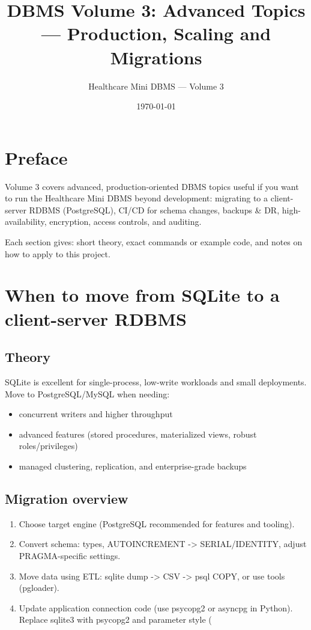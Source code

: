 \documentclass[11pt,a4paper]{article}
\title{DBMS Volume 3: Advanced Topics — Production, Scaling and Migrations}
\author{Healthcare Mini DBMS — Volume 3}
\date{\today}
\begin{document}
\maketitle
\tableofcontents
\newpage

\section*{Preface}
Volume 3 covers advanced, production-oriented DBMS topics useful if you want to run the Healthcare Mini DBMS beyond development: migrating to a client-server RDBMS (PostgreSQL), CI/CD for schema changes, backups & DR, high-availability, encryption, access controls, and auditing.

Each section gives: short theory, exact commands or example code, and notes on how to apply to this project.

\section{When to move from SQLite to a client-server RDBMS}
\subsection{Theory}
SQLite is excellent for single-process, low-write workloads and small deployments. Move to PostgreSQL/MySQL when needing:
\begin{itemize}
  \item concurrent writers and higher throughput
  \item advanced features (stored procedures, materialized views, robust roles/privileges)
  \item managed clustering, replication, and enterprise-grade backups
\end{itemize}

\subsection{Migration overview}
\begin{enumerate}
  \item Choose target engine (PostgreSQL recommended for features and tooling).
  \item Convert schema: types, AUTOINCREMENT -> SERIAL/IDENTITY, adjust PRAGMA-specific settings.
  \item Move data using ETL: sqlite dump -> CSV -> psql COPY, or use tools (pgloader).
  \item Update application connection code (use psycopg2 or asyncpg in Python). Replace sqlite3 with psycopg2 and parameter style (%
\end{enumerate}
\end{document}
